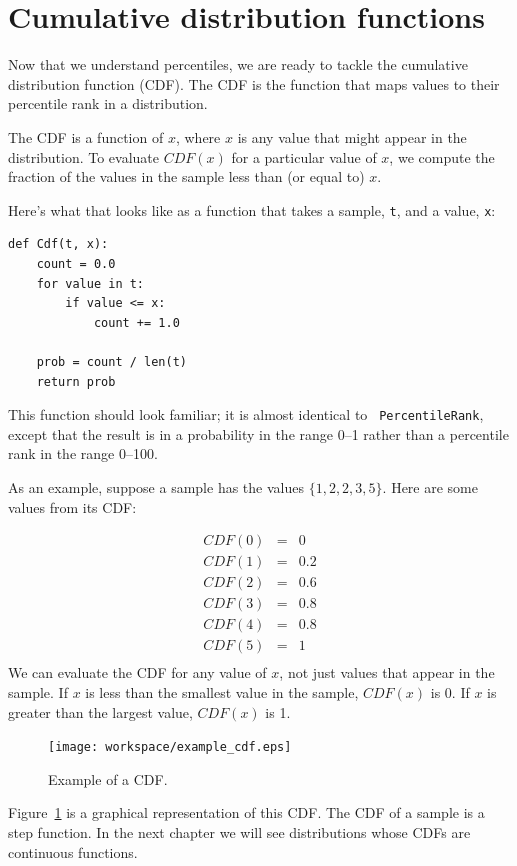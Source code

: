 \documentclass[12pt]{book}
\begin{document}
\section{Cumulative distribution functions}

Now that we understand percentiles, we are ready to tackle the
cumulative distribution function (CDF).  The CDF is the function that
maps values to their percentile rank in a distribution.

The CDF is a function of $x$, where $x$ is any value that might appear
in the distribution.  To evaluate $CDF(x)$ for a particular value of
$x$, we compute the fraction of the values in the sample less than (or
equal to) $x$.

Here's what that looks like as a function that takes a sample,
{\tt t}, and a value, {\tt x}:

\begin{verbatim}
def Cdf(t, x):
    count = 0.0
    for value in t:
        if value <= x:
            count += 1.0

    prob = count / len(t)
    return prob
\end{verbatim}

This function should look familiar; it is almost identical to {\tt
  PercentileRank}, except that the result is in a probability in the
range 0--1 rather than a percentile rank in the range 0--100.

As an example, suppose a sample has the values $\{1, 2, 2, 3, 5\}$.
Here are some values from its CDF:

\begin{eqnarray*}
CDF(0) &=& 0    \\
CDF(1) &=& 0.2    \\
CDF(2) &=& 0.6    \\
CDF(3) &=& 0.8    \\
CDF(4) &=& 0.8    \\
CDF(5) &=& 1    \\
\end{eqnarray*}
%
We can evaluate the CDF for any value of $x$, not just
values that appear in the sample.
If $x$ is less than the smallest value in the sample, $CDF(x)$ is 0.
If $x$ is greater than the largest value, $CDF(x)$ is 1.

\begin{figure}
\centerline{\texttt{[image: workspace/example\_cdf.eps]}}
\caption{Example of a CDF.}
\label{example_cdf}
\end{figure}

Figure~\ref{example_cdf} is a graphical representation of this CDF.
The CDF of a sample is a step function.  In the next chapter we
will see distributions whose CDFs are continuous functions.  
\end{document}
